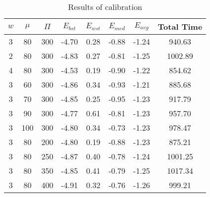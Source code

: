 \begin{table}[!h]
\centering
\begin{tabular}{@{}cccccccc@{}}
\toprule
$w$ & $\mu$ & $\Pi$ & $E_{bst}$  & $E_{wst}$ & $E_{med}$ & $E_{avg}$ & Total Time \\ \midrule
3   & 80    & 300   & -4.70      & 0.28      & -0.88     & -1.24     & 940.63     \\
2   & 80    & 300   & -4.83      & 0.27      & -0.81     & -1.25     & 1002.89    \\
4   & 80    & 300   & -4.53      & 0.19      & -0.90     & -1.22     & 854.62     \\
3   & 60    & 300   & -4.86      & 0.34      & -0.93     & -1.21     & 885.68     \\
3   & 70    & 300   & -4.85      & 0.25      & -0.95     & -1.23     & 917.79     \\
3   & 90    & 300   & -4.77      & 0.61      & -0.81     & -1.23     & 957.70     \\
3   & 100   & 300   & -4.80      & 0.34      & -0.73     & -1.23     & 978.47     \\
3   & 80    & 200   & -4.80      & 0.19      & -0.88     & -1.23     & 875.21     \\
3   & 80    & 250   & -4.87      & 0.40      & -0.78     & -1.24     & 1001.25    \\
3   & 80    & 350   & -4.85      & 0.41      & -0.79     & -1.25     & 1017.34    \\
3   & 80    & 400   & -4.91      & 0.32      & -0.76     & -1.26     & 999.21     \\
\bottomrule
\end{tabular}
\caption{Results of calibration}
\label{calibration-results}
\end{table}
